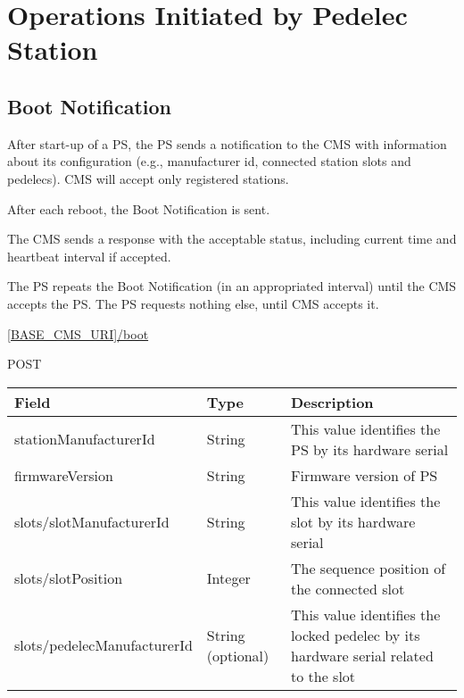 \section{Operations Initiated by Pedelec Station}

\subsection{Boot Notification}

After start-up of a \acs{PS}, the \acs{PS} sends a notification to the \acs{CMS} with information about its configuration (e.g., manufacturer id, connected station slots and pedelecs). \acs{CMS} will accept only registered stations. 

After each reboot, the Boot Notification is sent.

The \acs{CMS} sends a response with the acceptable status, including current time and heartbeat interval if accepted.

The \acs{PS} repeats the Boot Notification (in an appropriated interval) until the \acs{CMS} accepts the \acs{PS}. The \acs{PS} requests nothing else, until \acs{CMS} accepts it.


 \url{[BASE_CMS_URI]/boot}

 POST

\begin{table}[!h]
\vspace{-7mm}
\begin{tabularx}{\linewidth}{ | l | l | X | }
  \hline
  \rowcolor{table-head}
  Field & Type & Description \\
  \hline
  stationManufacturerId & String 		& This value identifies the \acs{PS} by its hardware serial \\
  firmwareVersion			& String & Firmware version of \acs{PS}\\
  slots/slotManufacturerId 	& String & This value identifies the slot by its hardware serial \\
  slots/slotPosition			& Integer & The sequence position of the connected slot \\
  slots/pedelecManufacturerId & String (optional) & This value identifies the locked pedelec by its hardware serial related to the slot \\
    \hline
\end{tabularx}
\end{table}

